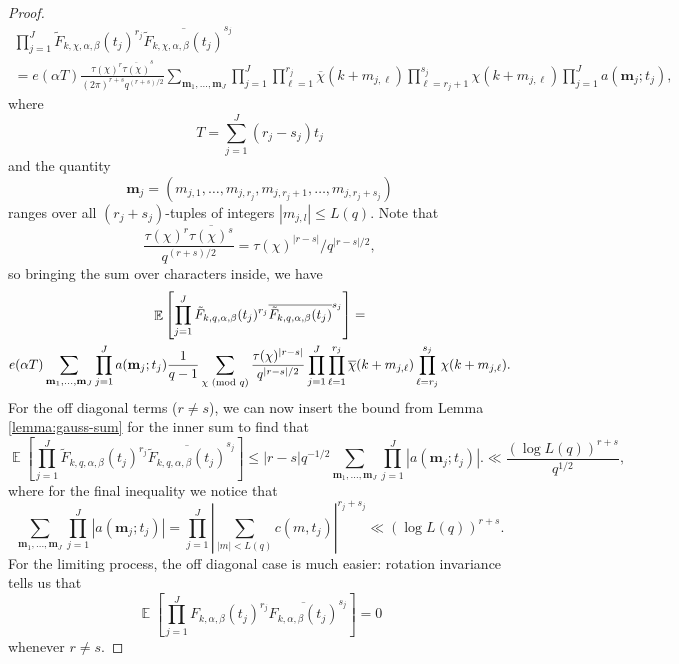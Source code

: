 \documentclass[12pt, a4paper]{amsart}
\theoremstyle{remark}
\newcommand{\abs}[1]{\left|#1\right|}
\renewcommand{\mod}[1]{{\ifmmode\text{\rm\ (mod~$#1$)}\else\discretionary{}{}{\hbox{ }}\rm(mod~$#1$)\fi}}
\newcommand{\chibar}{\overline \chi}
\newcommand{\bm}{\mathbf{m}}
\DeclareMathOperator{\E}{\mathbb{E}}
\begin{document}
\begin{proof}
\begin{multline}\label{eq:moment-mess}
    \prod_{j=1}^J \tilde F_{k,\chi,\alpha,\beta}(t_j)^{r_j} \overline{\tilde F_{k,\chi,\alpha,\beta}(t_j)}^{s_j}
    \\
    =
    e(\alpha T)
    \frac{\tau(\chi)^r \overline{\tau(\chi)}^s}{(2\pi)^{r+s}q^{(r + s)/2}}
 \sum_{\bm_1, \dots, \bm_J}
 \prod_{j=1}^J\prod_{\ell=1}^{r_j}\chibar(k + m_{j,\ell})
 \prod_{\ell=r_j + 1}^{s_j}\chi(k + m_{j,\ell})
 \prod_{j=1}^J a(\bm_j; t_j),
\end{multline}
where
\[
    T = \sum_{j=1}^J (r_j - s_j)t_j
\]
and the quantity
$$ \bm_j= (m_{j,1}, \dots, m_{j, r_j}, m_{j, r_j+1}, \dots, m_{j, r_j+s_j})$$
ranges over all $(r_j+s_j)$-tuples of integers $|m_{j, l}|\leq L(q)$.
Note that
\[
    \frac{\tau(\chi)^r \overline{\tau(\chi)^s}}{q^{(r+s)/2}} = \tau(\chi)^{|r-s|}/q^{|r-s|/2},
\]
so bringing the sum over characters inside, we have
\begin{multline*}
\E \left[ \prod_{j=1}^J \tilde F_{k,q,\alpha,\beta}(t_j)^{r_j} \overline{\tilde F_{k,q,\alpha,\beta}(t_j)}^{s_j} \right] = \\
    e(\alpha T)
 \sum_{\bm_1, \dots, \bm_J}
 \prod_{j=1}^J a(\bm_j; t_j)
 \frac{1}{q-1}
 \sum_{\chi \mod q}
 \frac{\tau(\chi)^{|r-s|}}{q^{|r - s|/2}}
 \prod_{j=1}^J\prod_{\ell=1}^{r_j}\chibar(k + m_{j,\ell})
 \prod_{\ell=r_j}^{s_j}\chi(k + m_{j,\ell}).
\end{multline*}
For the off diagonal terms ($r \ne s$), we can now insert the bound from Lemma
\ref{lemma:gauss-sum} for the inner sum to find that
\[
    \E \left[ \prod_{j=1}^J \tilde F_{k,q,\alpha,\beta}(t_j)^{r_j} \overline{\tilde F_{k,q,\alpha,\beta}(t_j)}^{s_j} \right]
     \le |r-s|q^{-1/2}
 \sum_{\bm_1, \dots, \bm_J}
 \prod_{j=1}^J \abs{a(\bm_j; t_j)}. \ll \frac{(\log L(q))^{r+s}}{q^{1/2}},
\]
where for the final inequality we notice that
\[
    \sum_{\bm_1, \dots, \bm_J}
    \prod_{j=1}^J \abs{a(\bm_j; t_j)} =
    \prod_{j=1}^J
    \left|\sum_{|m| < L(q)} c(m, t_j)\right|^{r_j + s_j}
    \ll (\log L(q))^{r+s}.
\]
For the limiting process, the off diagonal case is much easier: rotation
invariance tells us that
\[
\E \left[ \prod_{j=1}^J F_{k,\alpha,\beta}(t_j)^{r_j} \overline{F_{k,\alpha,\beta}(t_j)}^{s_j} \right]
 = 0
\]
whenever $r \ne s$.


\end{proof}
\end{document}
